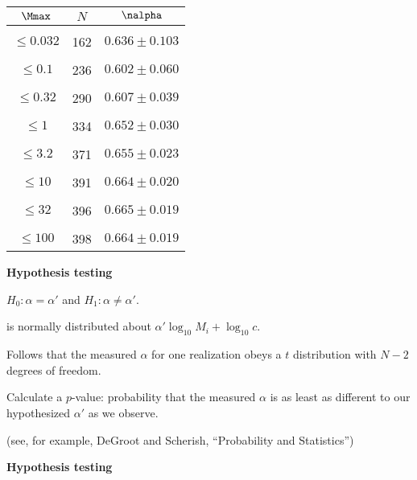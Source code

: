{  \begin{center}
    \begin{tabular}{c|c|c}
      $\Mmax$   & $N$ & $\nalpha$  \\ \hline
      & & \\
      $\leq 0.032$   & 162 & $0.636 \pm 0.103$ \\
      & & \\
      $\leq  0.1$    & 236 & $0.602 \pm 0.060$ \\
      & & \\
      $\leq 0.32$    & 290 & $0.607 \pm 0.039$ \\
      & & \\
      $\leq    1$    & 334 & $0.652 \pm 0.030$ \\
      & & \\
      $\leq  3.2$    & 371 & $0.655 \pm 0.023$ \\
      & & \\
      $\leq   10$    & 391 & $0.664 \pm 0.020$ \\
      & & \\
      $\leq   32$    & 396 & $0.665 \pm 0.019$ \\
      & & \\
      $\leq  100$    & 398 & $0.664 \pm 0.019$ \\
    \end{tabular}
  \end{center}



  \textbf{Hypothesis testing}


\inv

$H_0: \alpha = \alpha'$ and $H_1: \alpha \ne \alpha'.$

is normally distributed
about $\alpha' \log_{10} M_i + \log_{10} c$.

Follows that the measured $\alpha$ for
one realization obeys
a $t$ distribution with $N-2$ degrees of freedom.

Calculate a $p$-value: probability that the measured
$\alpha$ is as least as different to our hypothesized
$\alpha'$ as we observe.

{\tiny (see, for example, DeGroot and Scherish, ``Probability and Statistics'')}

\vis


  \textbf{Hypothesis testing}

}
